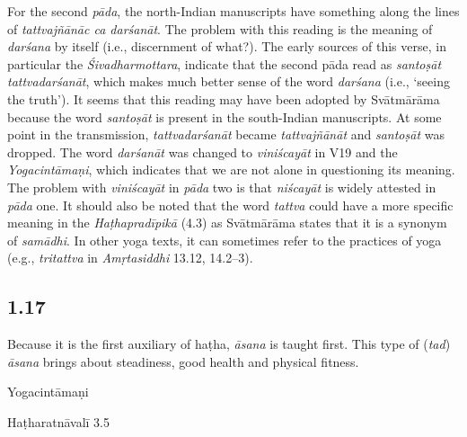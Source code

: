 \begin{ekdosis}
\begin{testimonia}[hp01_016]
\end{testimonia}

\begin{philcomm}[hp01_016]    
For the second \emph{pāda}, the north-Indian manuscripts have something along the lines of \emph{tattvajñānāc ca darśanāt}. The problem with this reading is the meaning of \emph{darśana} by itself (i.e., discernment of what?). The early sources of this verse, in particular the \emph{Śivadharmottara}, indicate that the second pāda read as \emph{santoṣāt tattvadarśanāt}, which makes much better sense of the word \emph{darśana} (i.e., ‘seeing the truth’). It seems that this reading may have been adopted by Svātmārāma because the word \emph{santoṣāt} is present in the south-Indian manuscripts. At some point in the transmission, \emph{tattvadarśanāt} became \emph{tattvajñānāt} and \emph{santoṣāt} was dropped. The word \emph{darśanāt} was changed to \emph{viniścayāt} in V19 and the \emph{Yogacintāmaṇi}, which indicates that we are not alone in questioning its meaning. The problem with \emph{viniścayāt} in \emph{pāda} two is that \emph{niścayāt} is widely attested in \emph{pāda} one. It should also be noted that the word \emph{tattva} could have a more specific meaning in the \emph{Haṭhapradīpikā} (4.3) as Svātmārāma states that it is a synonym of \emph{samādhi}. In other yoga texts, it can sometimes refer to the practices of yoga (e.g., \emph{tritattva} in \emph{Amṛtasiddhi} 13.12, 14.2--3). 
\end{philcomm}

\subsection*{1.17}
\begin{translation}[hp01_017]
Because it is the first auxiliary of haṭha, \emph{āsana} is taught first. This type of (\emph{tad}) \emph{āsana} brings about steadiness, good health and physical fitness.
\end{translation}

\begin{testimonia}[hp01_017]
Yogacintāmaṇi

\begin{versinnote}
\end{versinnote}

Haṭharatnāvalī 3.5


\end{testimonia}
\end{ekdosis}
